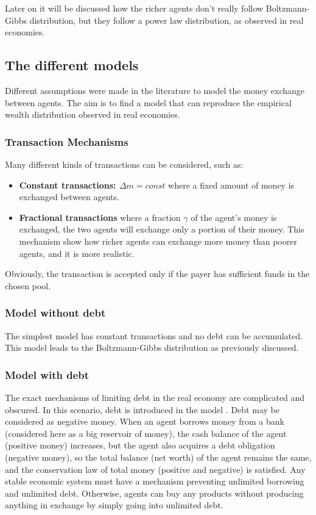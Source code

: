 Later on it will be discussed how the richer agents don't really follow Boltzmann-Gibbs distribution, but they follow a power law distribution, as observed in real economies.


\subsection{The different models}
Different assumptions were made in the literature to model the money exchange between agents.
The aim is to find a model that can reproduce the empirical wealth distribution observed in real economies.

\subsubsection{Transaction Mechanisms}
Many different kinds of transactions can be considered, such as:
\begin{itemize}
    \item \textbf{Constant transactions: $\Delta m = const$} where a fixed amount of money is exchanged between agents. 
    \item \textbf{Fractional transactions} where a fraction $\gamma$ of the agent's money is exchanged, the two agents will exchange
                                            only a portion of their money. This mechanism show how richer agents can exchange more money than poorer agents, and it is more realistic.

\end{itemize}
Obviously, the transaction is accepted only if the payer has sufficient funds in the chosen pool.


\subsubsection{Model without debt}
The simplest model has constant transactions and no debt can be accumulated. This model leads to the Boltzmann-Gibbs distribution as previously discussed.

\subsubsection{Model with debt}
\label{sec:debtModel}
The exact mechanisms of limiting debt in the real economy are complicated and obscured.
In this scenario, debt is introduced in the model \cite{yakovenko2012statistical}. 
Debt may be considered as negative money.
When an agent borrows money from a bank (considered here as a big reservoir of money), the cash balance of
the agent (positive money) increases, but the agent also acquires a debt
obligation (negative money), so the total balance (net worth) of the
agent remains the same, and the conservation law of total money
(positive and negative) is satisfied.
Any stable economic system must have a mechanism
preventing unlimited borrowing and unlimited debt. Otherwise, agents can
buy any products without producing anything in exchange by simply going
into unlimited debt.

